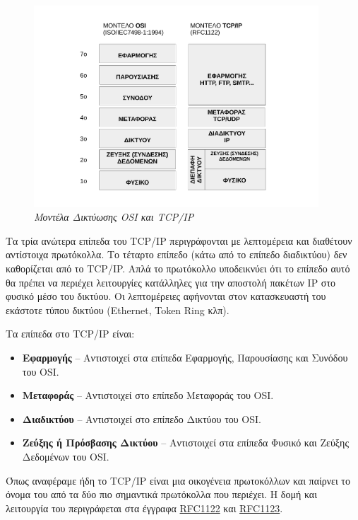 \begin{figure}[!ht]
  \centering
  \includegraphics[width=0.95\textwidth]{images/chapter1/1-1}
  \caption {\textsl{Μοντέλα Δικτύωσης OSI και TCP/IP}}
  \label{1-1}
\end{figure}

Τα τρία ανώτερα επίπεδα του TCP/IP περιγράφονται με λεπτομέρεια και διαθέτουν αντίστοιχα πρωτόκολλα.
Το τέταρτο επίπεδο (κάτω από το επίπεδο διαδικτύου) δεν καθορίζεται από το TCP/IP. Απλά το πρωτόκολλο
υποδεικνύει ότι το επίπεδο αυτό θα πρέπει να περιέχει λειτουργίες κατάλληλες για την αποστολή πακέτων
IP στο φυσικό μέσο του δικτύου. Οι λεπτομέρειες αφήνονται στον κατασκευαστή του εκάστοτε τύπου δικτύου (Ethernet, Token Ring κλπ).

Τα επίπεδα στο TCP/IP είναι:

\begin{itemize}
\item \textbf{Εφαρμογής} -- Αντιστοιχεί στα επίπεδα Εφαρμογής, Παρουσίασης και Συνόδου του OSI.
\item \textbf{Μεταφοράς} -- Αντιστοιχεί στο επίπεδο Μεταφοράς του OSI.
\item \textbf{Διαδικτύου} -- Αντιστοιχεί στο επίπεδο Δικτύου του OSI.
\item \textbf{Ζεύξης ή Πρόσβασης Δικτύου} -- Αντιστοιχεί στα επίπεδα Φυσικό και Ζεύξης Δεδομένων του OSI.
\end{itemize}

Όπως αναφέραμε ήδη το TCP/IP είναι μια οικογένεια πρωτοκόλλων και παίρνει το όνομα του από τα δύο πιο σημαντικά πρωτόκολλα που περιέχει. Η δομή και λειτουργία του περιγράφεται στα έγγραφα \href{https://tools.ietf.org/html/rfc1122}{RFC1122} και \href{https://tools.ietf.org/html/rfc1123}{RFC1123}.

